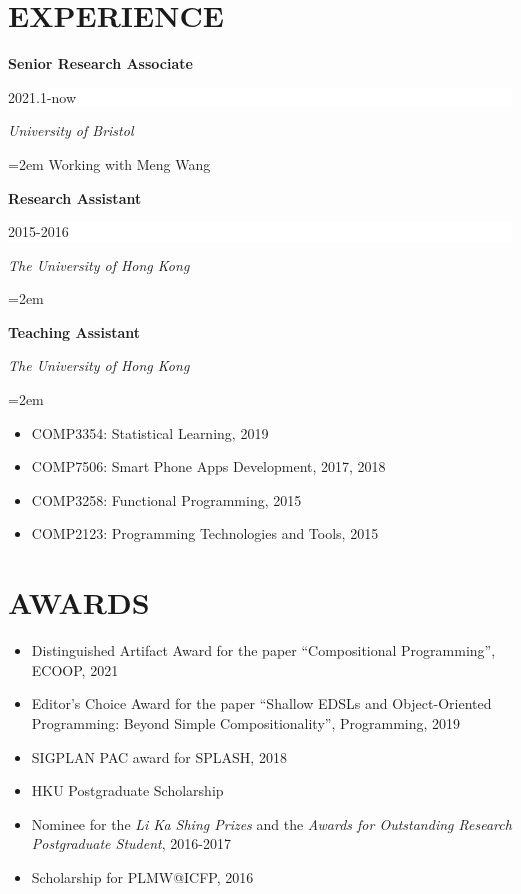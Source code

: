 \documentclass[paper=letter,fontsize=11pt]{scrartcl} %
\newcommand{\sepspace}{\vspace*{1em}}		%
\newcommand{\NewPart}[2]{\section*{\uppercase{#1} #2}}
\newcommand{\EducationEntry}[4]{
		\noindent \textbf{#1} \hfill      %
		\colorbox{White}{%
			\parbox{6em}{%
			\hfill\color{Black}#2}} \par  %
		\noindent \textit{#3} \par        %
		\noindent\hangindent=2em\hangafter=0 \small #4 %
		\normalsize \par}
\begin{document}
\NewPart{Experience}{}
\EducationEntry{Senior Research Associate}{2021.1-now}{University of Bristol}{Working with Meng Wang}
\EducationEntry{Research Assistant}{2015-2016}{The University of Hong Kong}{}
\EducationEntry{Teaching Assistant}{}{The University of Hong Kong}
{\begin{itemize}
\item{COMP3354: Statistical Learning, 2019}
\item{COMP7506: Smart Phone Apps Development, 2017, 2018}
\item{COMP3258: Functional Programming, 2015}
\item{COMP2123: Programming Technologies and Tools, 2015}
\end{itemize}}
\sepspace

\NewPart{Awards}{}
\begin{itemize}
\item Distinguished Artifact Award for the paper ``Compositional Programming'', ECOOP, 2021
\item Editor's Choice Award for the paper ``Shallow EDSLs and Object-Oriented
  Programming: Beyond Simple Compositionality'', Programming, 2019
\item SIGPLAN PAC award for SPLASH, 2018
\item HKU Postgraduate Scholarship
\item Nominee for the \emph{Li Ka Shing Prizes} and the \emph{Awards for Outstanding Research
  Postgraduate Student}, 2016-2017
\item Scholarship for PLMW@ICFP, 2016
\end{itemize}
\end{document}
